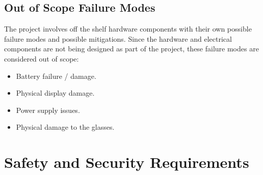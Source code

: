 \documentclass{article}
\begin{document}
\restoregeometry

\pdfpagewidth=8.5in \pdfpageheight=11in

\subsection{Out of Scope Failure Modes}
The project involves off the shelf hardware components with their own possible
failure modes and possible mitigations. Since the hardware and electrical
components are not being designed as part of the project, these failure modes
are considered out of scope:
\begin{itemize}
    \item Battery failure / damage.
    \item Physical display damage.
    \item Power supply issues.
    \item Physical damage to the glasses.
\end{itemize}


\section{Safety and Security Requirements}
\end{document}
